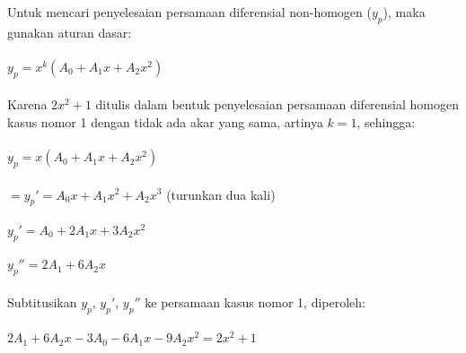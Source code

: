 \begin{enumerate}[1.]
	Untuk mencari penyelesaian persamaan diferensial non-homogen (\begin{math} y_p \end{math}), maka gunakan aturan dasar: \\ \\
	\begin{math} y_p = x^{k} (A_0 + A_1 x + A_2 x^{2}) \end{math} \\ \\
	Karena \begin{math} 2x^{2} + 1 \end{math} ditulis dalam bentuk penyelesaian persamaan diferensial homogen kasus nomor 1 dengan tidak ada akar yang sama, artinya \begin{math} k = 1 \end{math}, sehingga: \\ \\
	\begin{math} y_p = x (A_0 + A_1 x + A_2 x^{2}) \end{math}\\ \\
	\begin{math} = y_p' = A_0 x + A_1 x^{2} + A_2 x^{3} \end{math} (turunkan dua kali)  \\ \\
	\begin{math} y_p' = A_0 + 2 A_1 x + 3 A_2 x^{2} \end{math} \\ \\
	\begin{math} y_p'' = 2 A_1 + 6 A_2 x   \end{math} \\ \\
	Subtitusikan \begin{math} y_p \end{math}, \begin{math} y_p' \end{math}, \begin{math} y_ p'' \end{math} ke persamaan kasus nomor 1, diperoleh: \\ \\
	\begin{math} 2 A_1 + 6 A_2 x - 3 A_0 - 6 A_1 x - 9 A_2 x^{2} = 2x^{2} + 1 \end{math} \\ \\

\end{enumerate}
